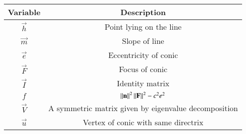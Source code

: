 \begin{tabular}[12pt]{ |c| c|}
	\hline
	\textbf{Variable} & \textbf{Description}\\ 
	\hline
	$\vec{h}$ & Point lying on the line\\
	\hline
	$\vec{m}$ & Slope of line\\
	\hline
	$\vec{e}$ & Eccentricity of conic\\
	\hline
	$\vec{F}$ & Focus of conic\\
	\hline
	$\vec{I}$ & Identity matrix\\
	\hline
	$f$ & $\left\lVert\mathbf{n}\right\rVert^2\left\lVert\mathbf{F}\right\rVert^2-c^2e^2$\\
	\hline
	$\vec{V}$ & A symmetric matrix given by eigenvalue decomposition\\
	\hline
	$\vec{u}$ & Vertex of conic with same directrix\\
	\hline
\end{tabular}
